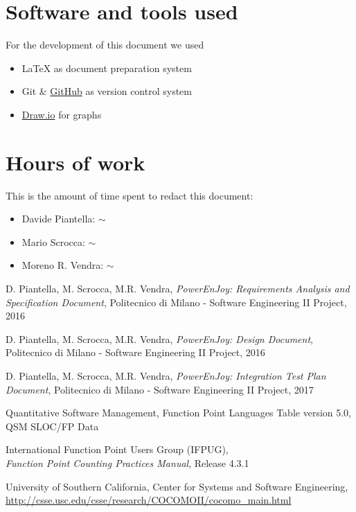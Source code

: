 \begin{appendices}

	\section{Software and tools used}
	For the development of this document we used
	\begin{itemize}
		\item \LaTeX{} as document preparation system
		\item Git \& \href{http://github.com}{GitHub} as version control system
		\item \href{http://draw.io}{Draw.io} for graphs 
	\end{itemize}
	
	\section{Hours of work}
	This is the amount of time spent to redact this document:
	\begin{itemize}
		\item Davide Piantella: $\sim$ 
		\item Mario Scrocca: $\sim$ 
		\item Moreno R. Vendra: $\sim$ 
	\end{itemize}
	
\end{appendices}


\begin{thebibliography}{9}

D. Piantella, M. Scrocca, M.R. Vendra, \emph{PowerEnJoy: Requirements Analysis and Specification Document}, Politecnico di Milano - Software Engineering II Project, 2016

D. Piantella, M. Scrocca, M.R. Vendra, \emph{PowerEnJoy: Design Document}, Politecnico di Milano - Software Engineering II Project, 2016

D. Piantella, M. Scrocca, M.R. Vendra, \emph{PowerEnJoy: Integration Test Plan Document}, Politecnico di Milano - Software Engineering II Project, 2017

Quantitative Software Management, Function Point Languages Table version 5.0, QSM SLOC/FP Data

International Function Point Users Group (IFPUG),
\\\emph{Function Point Counting Practices Manual}, Release 4.3.1 

University of Southern California, Center for Systems and Software Engineering, \url{http://csse.usc.edu/csse/research/COCOMOII/cocomo_main.html}

\end{thebibliography}